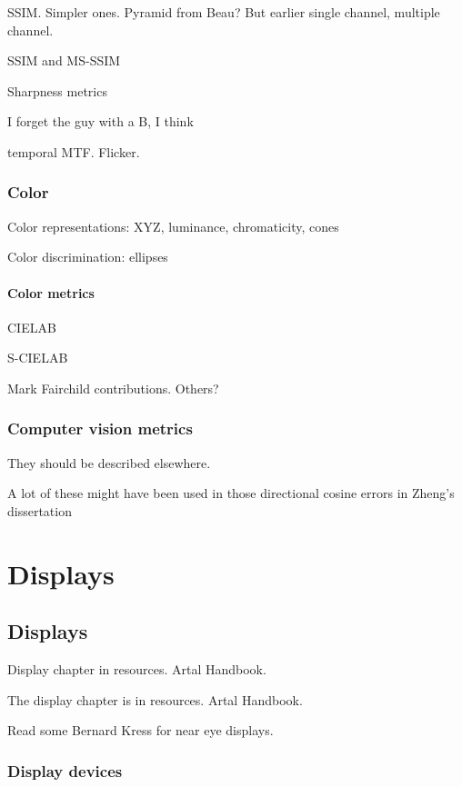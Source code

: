 \documentclass[
  letterpaper,
]{book}
\begin{document}
SSIM. Simpler ones. Pyramid from Beau? But earlier single channel,
multiple channel.

SSIM and MS-SSIM

Sharpness metrics

I forget the guy with a B, I think

temporal MTF. Flicker.

\section{Color}\label{color}

Color representations: XYZ, luminance, chromaticity, cones

Color discrimination: ellipses

\subsection{Color metrics}\label{color-metrics}

CIELAB

S-CIELAB

Mark Fairchild contributions. Others?

\section{Computer vision metrics}\label{computer-vision-metrics}

They should be described elsewhere.

A lot of these might have been used in those directional cosine errors
in Zheng's dissertation

\part{Displays}

\chapter{Displays}\label{sec-displays}

Display chapter in resources. Artal Handbook.

The display chapter is in resources. Artal Handbook.

Read some Bernard Kress for near eye displays.

\section{Display devices}\label{display-devices}
\end{document}
